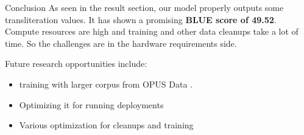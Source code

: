 \begin{chapter}{Conclusion}
As seen in the result section, our model properly outputs some transliteration values. It has shown a promising \textbf{BLUE score of 49.52}. Compute resources are high and training and other data cleanups take a lot of time. So the challenges are in the hardware requirements side.

Future research opportunities include: 
\begin{itemize}
    \item training with larger corpus from OPUS Data \cite{opusData}.
    \item Optimizing it for running deployments
    \item Various optimization for cleanups and training
\end{itemize}
\end{chapter}